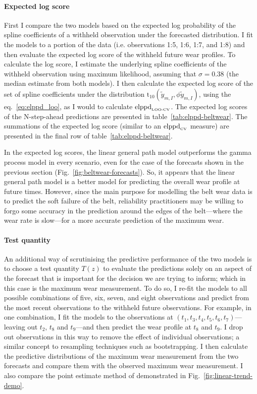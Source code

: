 \paragraph*{Expected log score}
First I compare the two models based on the expected log probability of the spline coefficients of a withheld observation under the forecasted distribution. I fit the models to a portion of the data (i.e. observations 1:5, 1:6, 1:7, and 1:8) and then evaluate the expected log score of the withheld future wear profiles. To calculate the log score, I estimate the underlying spline coefficients of the withheld observation using maximum likelihood, assuming that $\sigma = 0.38$ (the median estimate from both models). I then calculate the expected log score of the set of spline coefficients under the distribution $\mbox{t}_{10}(\tilde{y}_{m, I}, \phi \tilde{y}_{m, I})$, using the eq.~\ref{eq:elppd_loo}, as I would to calculate $\hbox{elppd}_{\text{\tiny{LOO-CV}}}$. The expected log scores of the N-step-ahead predictions are presented in table~\ref{tab:elppd-beltwear}. The summations of the expected log score (similar to an $\hbox{elppd}_{\text{\tiny{CV}}}$ measure) are presented in the final row of table~\ref{tab:elppd-beltwear}.



In the expected log scores, the linear general path model outperforms the gamma process model in every scenario, even for the case of the forecasts shown in the previous section (Fig.~\ref{fig:beltwear-forecasts}). So, it appears that the linear general path model is a better model for predicting the overall wear profile at future times. However, since the main purpose for modelling the belt wear data is to predict the soft failure of the belt, reliability practitioners may be willing to forgo some accuracy in the prediction around the edges of the belt---where the wear rate is slow---for a more accurate prediction of the maximum wear.

\paragraph*{Test quantity}
An additional way of scrutinising the predictive performance of the two models is to choose a test quantity $T(z)$ \citep[p. 145]{BDA2020} to evaluate the predictions solely on an aspect of the forecast that is important for the decision we are trying to inform; which in this case is the maximum wear measurement. To do so, I re-fit the models to all possible combinations of five, six, seven, and eight observations and predict from the most recent observations to the withheld future observations. For example, in one combination, I fit the models to the observations at $(t_1, t_3, t_4, t_5, t_6, t_7)$---leaving out $t_2$, $t_8$ and $t_9$---and then predict the wear profile at $t_8$ and $t_9$. I drop out observations in this way to remove the effect of individual observations; a similar concept to resampling techniques such as bootstrapping. I then calculate the predictive distributions of the maximum wear measurement from the two forecasts and compare them with the observed maximum wear measurement. I also compare the point estimate method of \citet{webb_2020} demonstrated in Fig.~\ref{fig:linear-trend-demo}.


